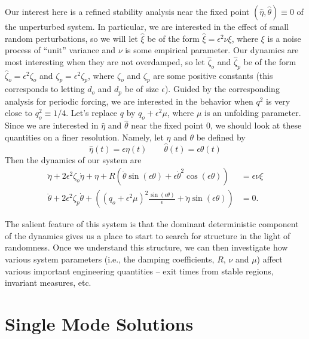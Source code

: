 Our interest here is a refined stability analysis near the fixed point $(\hat\eta,\hat\theta)\equiv 0$ of the unperturbed system. In particular, we are interested in the effect of small random perturbations, so we will let $\hat\xi$ be of the form $\hat\xi = \epsilon^2 \nu \xi$, where $\xi$ is a noise process of ``unit'' variance and $\nu$ is some empirical parameter. Our dynamics are most interesting when they are not overdamped, so let $\hat\zeta_o$ and $\hat\zeta_p$ be of the form $\hat\zeta_o = \epsilon^2 \zeta_o$ and $\zeta_p = \epsilon^2 \zeta_p$, where $\zeta_o$ and $\zeta_p$ are some positive constants (this corresponds to letting $d_o$ and $d_p$ be of size $\epsilon$). Guided by the corresponding analysis for periodic forcing, we are interested in the behavior when $q^2$ is very close to $q^2_o\equiv 1/4$. Let's replace $q$ by $q_o + \epsilon^2 \mu$, where $\mu$ is an unfolding parameter. Since we are interested in $\hat\eta$ and $\hat\theta$ near the fixed point $0$, we should look at these quantities on a finer resolution. Namely, let $\eta$ and $\theta$ be defined by
\[
\hat\eta(t) = \epsilon \eta(t) \qquad \hat\theta(t) = \epsilon \theta(t)
\]
Then the dynamics of our system are
\begin{equation}
\begin{aligned} 
\ddot \eta + 2 \epsilon^2 \zeta_o \dot \eta + \eta + R (\ddot\theta \sin(\epsilon\theta) + \epsilon \dot\theta^2 \cos (\epsilon\theta) ) &= \epsilon\nu\xi\\
\ddot \theta + 2 \epsilon^2 \zeta_p \dot \theta + \left( \left(q_o + \epsilon^2 \mu\right)^2 \frac{\sin (\epsilon \theta)}{\epsilon} + \ddot \eta \sin (\epsilon\theta) \right) &= 0.
\end{aligned}
\label{E:dynamics}
\end{equation}

The salient feature of this system is that the dominant deterministic component of the dynamics gives us a place to start to search for structure in the light of randomness. Once we understand this structure, we can then investigate how various system parameters (i.e., the damping coefficients, $R$, $\nu$ and $\mu$) affect various important engineering quantities -- exit times from stable regions, invariant measures, etc.

\section{Single Mode Solutions}
\label{S:single}

